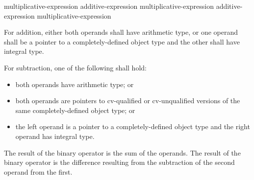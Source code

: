 %
%
%
%
%
%
%
\begin{bnf}
\br
    multiplicative-expression\br
    additive-expression \terminal{+} multiplicative-expression\br
    additive-expression \terminal{-} multiplicative-expression
\end{bnf}

%
For addition, either both operands shall have arithmetic
type, or one operand shall be a pointer to a completely-defined object
type and the other shall have integral type.

\pnum
For subtraction, one of the following shall hold:
\begin{itemize}
\item both operands have arithmetic type; or

\item
{}%
both operands are pointers to cv-qualified or cv-unqualified
versions of the same completely-defined object type; or

\item the left operand is a pointer to a completely-defined object type
and the right operand has integral type.
\end{itemize}

\pnum
The result of the binary \tcode{+} operator is the sum of the operands.
The result of the binary \tcode{-} operator is the difference resulting
from the subtraction of the second operand from the first.

